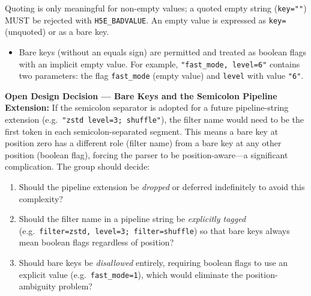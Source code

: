 \documentclass[../HDF5_RFC.tex]{subfiles}
\begin{document}
Quoting is only meaningful for non-empty values; a quoted empty string
(\texttt{key=""}) MUST be rejected with \texttt{H5E\_BADVALUE}.  An empty
value is expressed as \texttt{key=} (unquoted) or as a bare key.

\begin{itemize}
\item Bare keys (without an equals sign) are permitted and treated as boolean
  flags with an implicit empty value. For example, \texttt{"fast\_mode, level=6"}
  contains two parameters: the flag \texttt{fast\_mode} (empty value) and
  \texttt{level} with value \texttt{"6"}.
\end{itemize}

\noindent\colorbox{yellow!25}{\parbox{\dimexpr\linewidth-2\fboxsep}{%
  \textbf{Open Design Decision --- Bare Keys and the Semicolon Pipeline Extension:}
  If the semicolon separator is adopted for a future pipeline-string extension
  (e.g.\ \texttt{"zstd level=3; shuffle"}), the filter name would need to be
  the first token in each semicolon-separated segment.  This means a bare key
  at position zero has a different role (filter name) from a bare key at any
  other position (boolean flag), forcing the parser to be
  position-aware---a significant complication.  The group should decide:
  \begin{enumerate}
    \item Should the pipeline extension be \emph{dropped} or deferred
          indefinitely to avoid this complexity?
    \item Should the filter name in a pipeline string be \emph{explicitly
          tagged} (e.g.\ \texttt{filter=zstd, level=3; filter=shuffle})
          so that bare keys always mean boolean flags regardless of position?
    \item Should bare keys be \emph{disallowed} entirely, requiring boolean
          flags to use an explicit value (e.g.\ \texttt{fast\_mode=1}),
          which would eliminate the position-ambiguity problem?
  \end{enumerate}
}}
\end{document}
